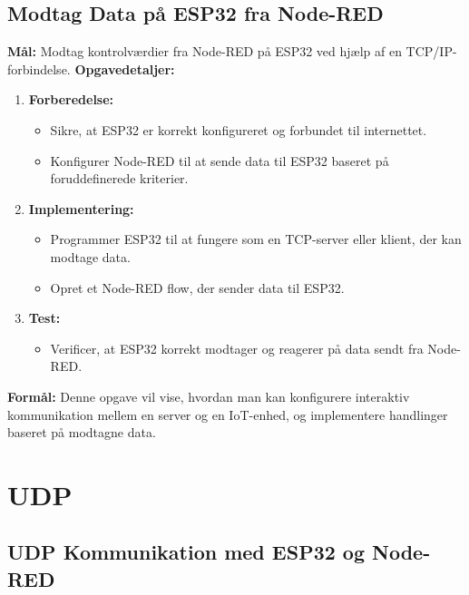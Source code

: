 \subsection*{Modtag Data på ESP32 fra Node-RED}
\textbf{Mål:} Modtag kontrolværdier fra Node-RED på ESP32 ved hjælp af en TCP/IP-forbindelse.
\newline\newline\noindent
\textbf{Opgavedetaljer:}
\begin{enumerate}
	\item \textbf{Forberedelse:}
	\begin{itemize}
		\item Sikre, at ESP32 er korrekt konfigureret og forbundet til internettet.
		\item Konfigurer Node-RED til at sende data til ESP32 baseret på foruddefinerede kriterier.
	\end{itemize}
	\item \textbf{Implementering:}
	\begin{itemize}
		\item Programmer ESP32 til at fungere som en TCP-server eller klient, der kan modtage data.
		\item Opret et Node-RED flow, der sender data til ESP32.
	\end{itemize}
	\item \textbf{Test:}
	\begin{itemize}
		\item Verificer, at ESP32 korrekt modtager og reagerer på data sendt fra Node-RED.
	\end{itemize}
\end{enumerate}
\textbf{Formål:} Denne opgave vil vise, hvordan man kan konfigurere interaktiv kommunikation mellem en server og en IoT-enhed, og implementere handlinger baseret på modtagne data.

\section{UDP}
\subsection*{UDP Kommunikation med ESP32 og Node-RED}
